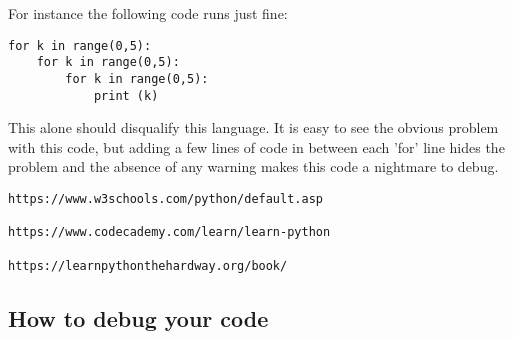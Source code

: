 For instance the following code runs just fine:

\begin{lstlisting}
for k in range(0,5): 
    for k in range(0,5):
        for k in range(0,5):
            print (k)
\end{lstlisting}

This alone should disqualify this language. It is easy to see the obvious problem with this code, but adding a few lines of code in between each 'for' line hides the problem and the absence of any warning makes this code a nightmare to debug.



\begin{verbatim}
https://www.w3schools.com/python/default.asp

https://www.codecademy.com/learn/learn-python

https://learnpythonthehardway.org/book/
\end{verbatim}


\subsection{How to debug your code}


